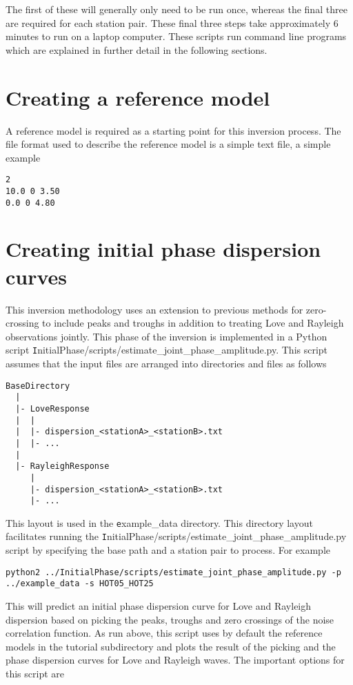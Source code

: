 \documentclass{article}
\begin{document}
The first of these will generally only need to be run once, whereas the final three
are required for each station pair. These final three steps take approximately
6 minutes to run on a laptop computer. These scripts run command line programs which
are explained in further detail in the following sections.

\section{Creating a reference model}

A reference model is required as a starting point for this inversion process. The file format used
to describe the reference model is a simple text file, a simple example

\begin{verbatim}
2
10.0 0 3.50
0.0 0 4.80
\end{verbatim}

\section{Creating initial phase dispersion curves}

This inversion methodology uses an extension to previous methods for zero-crossing to include peaks and
troughs in addition to treating Love and Rayleigh observations jointly. This phase of the inversion is
implemented in a Python script {\texttt InitialPhase/scripts/estimate\_joint\_phase\_amplitude.py}. This script
assumes that the input files are arranged into directories and files as follows

\begin{verbatim}
BaseDirectory
  |
  |- LoveResponse
  |  |
  |  |- dispersion_<stationA>_<stationB>.txt
  |  |- ...
  |
  |- RayleighResponse
     |
     |- dispersion_<stationA>_<stationB>.txt
     |- ...
\end{verbatim}

This layout is used in the {\texttt example\_data} directory. This directory layout facilitates running the
{\texttt InitialPhase/scripts/estimate\_joint\_phase\_amplitude.py} script by specifying the base path
and a station pair to process. For example

\begin{verbatim}
python2 ../InitialPhase/scripts/estimate_joint_phase_amplitude.py -p ../example_data -s HOT05_HOT25 
\end{verbatim}

This will predict an initial phase dispersion curve for Love and Rayleigh dispersion based on picking
the peaks, troughs and zero crossings of the noise correlation function. As run above, this script
uses by default the reference models in the tutorial subdirectory and plots the result of the picking
and the phase dispersion curves for Love and Rayleigh waves. The important options for this script
are
\end{document}
